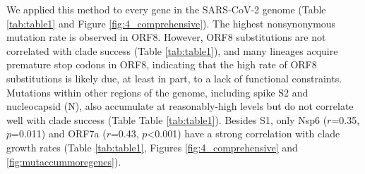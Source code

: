 \documentclass[11pt,oneside,letterpaper]{article}
\begin{document}
We applied this method to every gene in the SARS-CoV-2 genome (Table \ref{tab:table1} and Figure \ref{fig:4_comprehensive}). The highest nonsynonymous mutation rate is observed in ORF8.
However, ORF8 substitutions are not correlated with clade success (Table \ref{tab:table1}), and many lineages acquire premature stop codons in ORF8, indicating that the high rate of ORF8 substitutions is likely due, at least in part, to a lack of functional constraints.
Mutations within other regions of the genome, including spike S2 and nucleocapsid (N), also accumulate at reasonably-high levels but do not correlate well with clade success (Table Table \ref{tab:table1}).
Besides S1, only Nsp6 ($r$=0.35, $p$=0.011) and ORF7a ($r$=0.43, $p$\textless0.001) have a strong correlation with clade growth rates (Table \ref{tab:table1}, Figures \ref{fig:4_comprehensive} and \ref{fig:mutaccummoregenes}).
\end{document}
